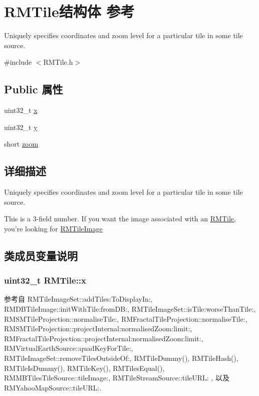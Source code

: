 \hypertarget{struct_r_m_tile}{\section{R\-M\-Tile结构体 参考}
\label{struct_r_m_tile}
}


Uniquely specifies coordinates and zoom level for a particular tile in some tile source.  




{\ttfamily \#include $<$R\-M\-Tile.\-h$>$}

\subsection*{Public 属性}
\begin{DoxyCompactItemize}
\item 
uint32\-\_\-t \hyperlink{struct_r_m_tile_a9f8922832041020ebb8084d8777208eb}{x}
\item 
uint32\-\_\-t \hyperlink{struct_r_m_tile_a3a4a0631b9b4aeeb72165965f7363cf7}{y}
\item 
short \hyperlink{struct_r_m_tile_a3fcd336d510455edc2d10d9f0f5887d8}{zoom}
\end{DoxyCompactItemize}


\subsection{详细描述}
Uniquely specifies coordinates and zoom level for a particular tile in some tile source. 

This is a 3-\/field number. If you want the image associated with an \hyperlink{struct_r_m_tile}{R\-M\-Tile}, you're looking for \hyperlink{interface_r_m_tile_image}{R\-M\-Tile\-Image} 

\subsection{类成员变量说明}
\hypertarget{struct_r_m_tile_a9f8922832041020ebb8084d8777208eb}{
\subsubsection[{x}]{\setlength{\rightskip}{0pt plus 5cm}uint32\-\_\-t R\-M\-Tile\-::x}}\label{struct_r_m_tile_a9f8922832041020ebb8084d8777208eb}


参考自 R\-M\-Tile\-Image\-Set\-::add\-Tiles\-:\-To\-Display\-In\-:, R\-M\-D\-B\-Tile\-Image\-::init\-With\-Tile\-:from\-D\-B\-:, R\-M\-Tile\-Image\-Set\-::is\-Tile\-:worse\-Than\-Tile\-:, R\-M\-S\-M\-Tile\-Projection\-::normalise\-Tile\-:, R\-M\-Fractal\-Tile\-Projection\-::normalise\-Tile\-:, R\-M\-S\-M\-Tile\-Projection\-::project\-Internal\-:normalised\-Zoom\-:limit\-:, R\-M\-Fractal\-Tile\-Projection\-::project\-Internal\-:normalised\-Zoom\-:limit\-:, R\-M\-Virtual\-Earth\-Source\-::quad\-Key\-For\-Tile\-:, R\-M\-Tile\-Image\-Set\-::remove\-Tiles\-Outside\-Of\-:, R\-M\-Tile\-Dummy(), R\-M\-Tile\-Hash(), R\-M\-Tile\-Is\-Dummy(), R\-M\-Tile\-Key(), R\-M\-Tiles\-Equal(), R\-M\-M\-B\-Tiles\-Tile\-Source\-::tile\-Image\-:, R\-M\-Tile\-Stream\-Source\-::tile\-U\-R\-L\-: , 以及 R\-M\-Yahoo\-Map\-Source\-::tile\-U\-R\-L\-:.

